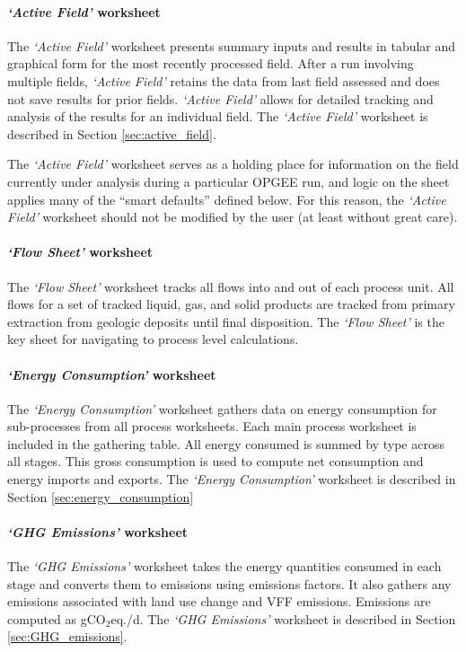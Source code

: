 \documentclass[11pt]{report}
\newcommand{\sheet}[1]{\textit{`{#1}'}}
\begin{document}
\paragraph{\sheet{Active Field} worksheet}
The \sheet{Active Field} worksheet presents summary inputs and results in tabular and graphical form for the most recently processed field. After a run involving multiple fields, \sheet{Active Field} retains the data from last field assessed and does not save results for prior fields. \sheet{Active Field} allows for detailed tracking and analysis of the results for an individual field. The \sheet{Active Field} worksheet is described in Section \ref{sec:active_field}.  

The \sheet{Active Field} worksheet serves as a holding place for information on the field currently under analysis during a particular OPGEE run, and logic on the sheet applies many of the ``smart defaults'' defined below.  For this reason, the \sheet{Active Field} worksheet should not be modified by the user (at least without great care). 

\paragraph{\sheet{Flow Sheet} worksheet}

The \sheet{Flow Sheet} worksheet tracks all flows into and out of each process unit. All flows for a set of tracked liquid, gas, and solid products are tracked from primary extraction from geologic deposits until final disposition.  The \sheet{Flow Sheet} is the key sheet for navigating to process level calculations.


\paragraph{\sheet{Energy Consumption} worksheet}
The \sheet{Energy Consumption} worksheet gathers data on energy consumption for sub-processes from all process worksheets. Each main process worksheet is included in the gathering table. All energy consumed is summed by type across all stages. This gross consumption is used to compute net consumption and energy imports and exports. The \sheet{Energy Consumption} worksheet is described in Section \ref{sec:energy_consumption} 

\paragraph{\sheet{GHG Emissions} worksheet}
The \sheet{GHG Emissions} worksheet takes the energy quantities consumed in each stage and converts them to emissions using emissions factors. It also gathers any emissions associated with land use change and VFF emissions. Emissions are computed as gCO$_2$eq./d. The \sheet{GHG Emissions} worksheet is described in Section \ref{sec:GHG_emissions}.
\end{document}
